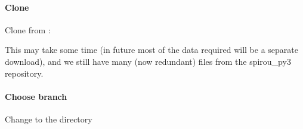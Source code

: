 \documentclass[a4paper,10pt,english]{report}
\begin{document}
\paragraph{Clone}
\label{\detokenize{user/general/installation:clone}}
Clone from :

\begin{sphinxVerbatim}[commandchars=\\\{\}]
   
\end{sphinxVerbatim}

This may take some time (in future most of the data required will be a separate download),
and we still have many (now redundant) files from the spirou\_py3 repository.


\paragraph{Choose branch}
\label{\detokenize{user/general/installation:choose-branch}}\label{\detokenize{user/general/installation:installation-choose-branch}}
Change to the  directory
\end{document}

